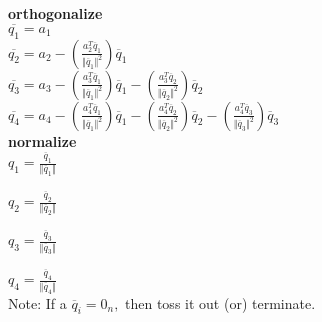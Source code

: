 \documentclass[11pt,fleqn]{article}
\begin{document}
\begin{enumerate}
\textbf{orthogonalize}\\

$\overline{q_1}=a_1$\\

$\overline{q_2}=a_2- \left(\frac{a_2^T\overline{q}_{1}}{\Vert \overline{q}_{1}\Vert^2}\right)\overline{q}_{1}$\\

$\overline{q_3}=a_3- \left(\frac{a_3^T\overline{q}_{1}}{\Vert \overline{q}_{1}\Vert^2}\right)\overline{q}_{1}- \left(\frac{a_3^T\overline{q}_{2}}{\Vert \overline{q}_{2}\Vert^2}\right)\overline{q}_{2}$\\

$\overline{q_4}=a_4- \left(\frac{a_4^T\overline{q}_{1}}{\Vert \overline{q}_{1}\Vert^2}\right)\overline{q}_{1}- \left(\frac{a_4^T\overline{q}_{2}}{\Vert \overline{q}_{2}\Vert^2}\right)\overline{q}_{2}- \left(\frac{a_4^T\overline{q}_{3}}{\Vert \overline{q}_{3}\Vert^2}\right)\overline{q}_{3}$\\



\textbf{normalize}\\

$q_1=\frac{\overline{q}_1}{\Vert \overline{q}_1\Vert}$

$q_2=\frac{\overline{q}_2}{\Vert \overline{q}_2\Vert}$

$q_3=\frac{\overline{q}_3}{\Vert \overline{q}_3\Vert}$

$q_4=\frac{\overline{q}_4}{\Vert \overline{q}_4\Vert}$\\


Note: {If a $\overline{q}_i=0_n,$ then toss it out (or) terminate.}

\end{enumerate}
\end{document}
